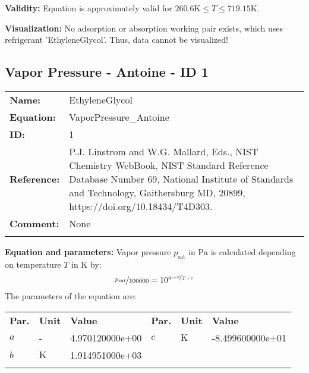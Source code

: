 \textbf{Validity:}
\newline
Equation is approximately valid for $260.6 \si{\kelvin} \leq T \leq 719.15 \si{\kelvin}$.
\newline

\textbf{Visualization:}
%
\newline
No adsorption or absorption working pair exists, which uses refrigerant 'EthyleneGlycol'. Thus, data cannot be visualized!
%

\FloatBarrier
\newpage
\subsection{Vapor Pressure - Antoine - ID 1}
%
\begin{tabular}[l]{|lp{11.5cm}|}
\hline
\addlinespace

\textbf{Name:} & EthyleneGlycol \\
\textbf{Equation:} & VaporPressure\_Antoine \\
\textbf{ID:} & 1 \\
\textbf{Reference:} & P.J. Linstrom and W.G. Mallard, Eds., NIST Chemistry WebBook, NIST Standard Reference Database Number 69, National Institute of Standards and Technology, Gaithersburg MD, 20899, https://doi.org/10.18434/T4D303. \\
\textbf{Comment:} & None \\

\addlinespace
\hline
\end{tabular}
\newline

\textbf{Equation and parameters:}
\newline
%
Vapor pressure $p_\mathrm{sat}$ in $\si{\pascal}$ is calculated depending on temperature $T$ in $\si{\kelvin}$ by:
%
\begin{equation*}
\nicefrac{p_\mathrm{sat}}{100000} = 10^{a - \nicefrac{b}{T + c}}
\end{equation*}
%
The parameters of the equation are:
%
\begin{longtable}[l]{lll|lll}
\toprule
\addlinespace
\textbf{Par.} & \textbf{Unit} & \textbf{Value} &	\textbf{Par.} & \textbf{Unit} & \textbf{Value} \\
\addlinespace
\midrule
\endhead

\bottomrule
\endfoot
\bottomrule
\endlastfoot
\addlinespace

$a$ & - & 4.970120000e+00 & $c$ & $\si{\kelvin}$  & -8.499600000e+01 \\
$b$ & $\si{\kelvin}$ & 1.914951000e+03 & & & \\

\addlinespace\end{longtable}

